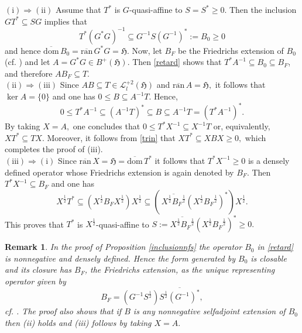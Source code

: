 \documentclass{amsart}
\makeatletter
\newtheorem{remark}[theorem]{Remark}
\newcommand{\h}{\mathfrak{H}}
\newcommand{\ranbar}{\overline{\mathrm{ran}}\,}
\newcommand{\ranbarA}{\mathrm{\overline{ran}}\, A}
\newcommand{\dombar}{\overline{\mathrm{dom}}\,}%
\newcommand{\adj}{^*}
\newcommand{\inv}{^{-1}}
\newcommand{\tstar}{T^{*}}
\newcommand{\half}{^{\frac{1}{2}}}
\newcommand{\inclu}{\subseteq}
\newcommand{\lplus}{B^{+}(\h)}
\newcommand{\ldeux}{\mathcal{L}_l^{+2}(\h)}
\numberwithin{equation}{section}
\renewenvironment{proof}[1][\proofname]{%
   \par\pushQED{\qed}\normalfont%
   \topsep6\p@\@plus6\p@\relax
   \trivlist\item[\hskip\labelsep\bfseries#1\@addpunct{.}]%
   \ignorespaces
}{%
   \popQED\endtrivlist\@endpefalse
}
\makeatother
\begin{document}
\begin{proof}
$\mathrm{(i)} \Rightarrow \mathrm{(ii)} $ Assume that  $\tstar$ is $G$-quasi-affine to      $S =S\adj \geq 0.$  Then the inclusion $G \tstar \inclu S G$ implies that
\begin{equation}\label{retard}
  \tstar (G\adj G)\inv  \inclu G\inv S (G\inv)\adj := B_0 \geq 0
\end{equation}
 and hence $\dombar B_0 = \ranbar G\adj G = \h.$    Now, let $B_F$  be the Friedrichs extension of $B_0$ (cf. \cite{kato1980}) and let $A= G\adj G \in \lplus.$  Then  \eqref{retard} shows that    $\tstar A\inv  \inclu   B_0 \inclu B_F$, and therefore $A B_F \inclu T$.   \\
      \hspace*{0.4cm}  $\mathrm{(ii)} \Rightarrow \mathrm{(iii)} $ Since $AB \inclu T \in \ldeux$ and $\ranbarA= \h,$ it follows that $\ker A= \{0\}$ and one has  $0 \leq B \inclu A\inv T.$ Hence,
       \begin{equation}\label{trin}
         0 \leq \tstar A\inv \inclu  (A\inv T)\adj \inclu B \inclu A\inv T = (\tstar A\inv)\adj.
       \end{equation}
       By taking $X= A,$ one concludes that $0 \leq \tstar X\inv \inclu   X\inv T $ or, equivalently, $ X \tstar   \inclu   T X .$ Moreover, it follows from \eqref{trin} that
       $ X\tstar \inclu XBX \geq 0,$ which completes the proof of (iii).  \\
  \hspace*{0.4cm}  $\mathrm{(iii)} \Rightarrow \mathrm{(i)} $ Since $\ranbar X= \h=\dombar \tstar$ it follows that $ \tstar X\inv \geq 0$ is a densely defined operator whose Friedrichs extension is again denoted by $B_F.$     Then
  $
   \tstar X\inv \inclu B_F
   $
   and   one has
   $$
   X\half \tstar  \inclu  (X\half B_F X\half) X\half  \inclu \left( \, \overline{X\half {B_F}\half} (X\half {B_F}\half)\adj \right) X\half.
   $$
   This proves that $\tstar$ is $X\half$-quasi-affine to $ S:=  \overline{X\half {B_F}\half} (X\half {B_F}\half)\adj  \geq 0.$
        \end{proof}


\begin{remark}\normalfont \label{rembf} In the proof of Proposition \ref{inclusionnfs} the operator $  B_0 $ in \eqref{retard} is nonnegative and densely defined. Hence the form generated by $B_0$ is closable and its closure has $B_F$, the Friedrichs extension, as the unique representing   operator given by
  \begin{equation}\label{BF}
    B_F = (G\inv S\half) \overline{S\half  {(G\inv)}\adj},
  \end{equation}
cf. \cite{kato1980}.
The proof also shows that if $B$ is any nonnegative selfadjoint extension of $B_0$ then (ii) holds and (iii) follows by taking $X=A.$
\end{remark}
\end{document}
